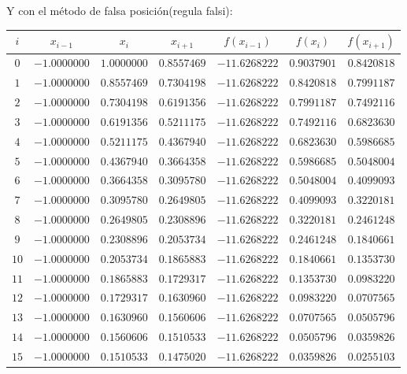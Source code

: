 Y con el método de falsa posición(regula falsi):
\begin{center}
	\begin{longtable}{|c|c|c|c|c|c|c|} \hline
		$i$ & $x_{i-1}$ & $x_{i}$ & $x_{i+1}$ & $f(x_{i-1})$ & $f(x_{i})$ & $f(x_{i+1})$ \\ \hline
		$0$ & $-1.0000000$ & $1.0000000$ & $0.8557469$ & $-11.6268222$ & $0.9037901$ & $0.8420818$ \\ \hline
		$1$ & $-1.0000000$ & $0.8557469$ & $0.7304198$ & $-11.6268222$ & $0.8420818$ & $0.7991187$ \\ \hline
		$2$ & $-1.0000000$ & $0.7304198$ & $0.6191356$ & $-11.6268222$ & $0.7991187$ & $0.7492116$ \\ \hline
		$3$ & $-1.0000000$ & $0.6191356$ & $0.5211175$ & $-11.6268222$ & $0.7492116$ & $0.6823630$ \\ \hline
		$4$ & $-1.0000000$ & $0.5211175$ & $0.4367940$ & $-11.6268222$ & $0.6823630$ & $0.5986685$ \\ \hline
		$5$ & $-1.0000000$ & $0.4367940$ & $0.3664358$ & $-11.6268222$ & $0.5986685$ & $0.5048004$ \\ \hline
		$6$ & $-1.0000000$ & $0.3664358$ & $0.3095780$ & $-11.6268222$ & $0.5048004$ & $0.4099093$ \\ \hline
		$7$ & $-1.0000000$ & $0.3095780$ & $0.2649805$ & $-11.6268222$ & $0.4099093$ & $0.3220181$ \\ \hline
		$8$ & $-1.0000000$ & $0.2649805$ & $0.2308896$ & $-11.6268222$ & $0.3220181$ & $0.2461248$ \\ \hline
		$9$ & $-1.0000000$ & $0.2308896$ & $0.2053734$ & $-11.6268222$ & $0.2461248$ & $0.1840661$ \\ \hline
		$10$ & $-1.0000000$ & $0.2053734$ & $0.1865883$ & $-11.6268222$ & $0.1840661$ & $0.1353730$ \\ \hline
		$11$ & $-1.0000000$ & $0.1865883$ & $0.1729317$ & $-11.6268222$ & $0.1353730$ & $0.0983220$ \\ \hline
		$12$ & $-1.0000000$ & $0.1729317$ & $0.1630960$ & $-11.6268222$ & $0.0983220$ & $0.0707565$ \\ \hline
		$13$ & $-1.0000000$ & $0.1630960$ & $0.1560606$ & $-11.6268222$ & $0.0707565$ & $0.0505796$ \\ \hline
		$14$ & $-1.0000000$ & $0.1560606$ & $0.1510533$ & $-11.6268222$ & $0.0505796$ & $0.0359826$ \\ \hline
		$15$ & $-1.0000000$ & $0.1510533$ & $0.1475020$ & $-11.6268222$ & $0.0359826$ & $0.0255103$ \\ \hline

\end{longtable}
\end{center}
